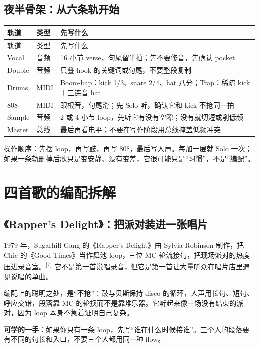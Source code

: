 \subsection{夜半骨架：从六条轨开始}
\label{sec:hiphop-yeban}

\begin{longtable}{p{}p{}p{}}
\toprule
轨道 & 类型 & 先写什么 \\
\midrule
\endfirsthead
\toprule
轨道 & 类型 & 先写什么 \\
\midrule
\endhead
Vocal & 音频 & 16 小节 verse，句尾留半拍；先不要修音，先确认 pocket \\
Double & 音频 & 只叠 hook 的关键词或句尾，不要整段复制 \\
Drums & MIDI & Boom-bap：kick 1/3、snare 2/4、hat 八分；Trap：稀疏 kick＋三连音 hat \\
808 & MIDI & 跟根音，句尾滑；先 Solo 听，确认它和 kick 不抢同一拍 \\
Sample & 音频 & 2 或 4 小节 loop，先听它有没有空隙；没有就切短或削低频 \\
Master & 总线 & 最后再看电平；不要在写作阶段用总线掩盖低频冲突 \\
\bottomrule
\end{longtable}

操作顺序：先摆 loop，再写鼓，再写 808，最后写人声。每加一层就 Solo 一次；如果一条轨删掉后歌只是变安静、没有变差，它很可能只是“习惯”，不是“编配”。

\section{四首歌的编配拆解}
\label{sec:hiphop-cases}

\subsection{《Rapper's Delight》：把派对装进一张唱片}
\label{sec:hiphop-case-rappers-delight}

1979 年，Sugarhill Gang 的《Rapper's Delight》由 Sylvia Robinson 制作，把 Chic 的《Good Times》当作舞池 loop，三位 MC 轮流接句，把现场派对的热度压进录音室。{\textsuperscript{[7]}} 它不是第一首说唱录音，但它是第一首让大量听众在唱片店里遇见说唱的单曲。

编配上的聪明之处，是“不抢”：鼓与贝斯保持 disco 的循环，人声用长句、短句、呼应交错，段落靠 MC 的轮换而不是靠堆乐器。它听起来像一场没有结束的派对，因为 loop 本身不急着证明自己复杂。

\textbf{可学的一手}：如果你只有一条 loop，先写“谁在什么时候接谁”。三个人的段落要有不同的句长和入口，不要三个人都用同一种 flow。

